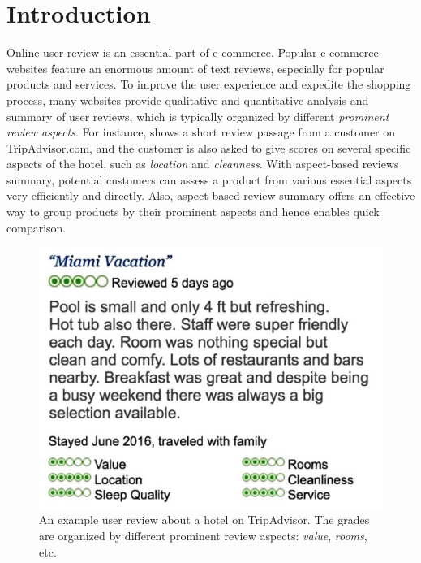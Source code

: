\section{Introduction}
\label{sec:intro}
Online user review is an essential part of e-commerce. 
Popular e-commerce websites feature an enormous amount of text reviews, 
especially for popular products and services. 
To improve the user experience and expedite the
shopping process, many websites provide qualitative and quantitative
analysis and summary of user reviews, which is typically organized by different 
{\em prominent review aspects}.
For instance,  shows a short review passage from a customer on TripAdvisor.com, and the customer is also asked
to give scores on several specific aspects of 
the hotel, such as \textit{location} and \textit{cleanness}. 
%
With aspect-based reviews summary, potential customers can 
assess a product from various essential aspects very efficiently and directly.
Also, aspect-based review summary offers an effective 
way to group products by their prominent aspects and hence
enables quick comparison.
\begin{figure}[th!]
	\centering
	\includegraphics[width=0.8\columnwidth]{figures/tripadvisor}
	\caption{An example user review about a hotel on TripAdvisor. 
		The grades are organized by different prominent review aspects: \textit{value}, \textit{rooms}, etc. }
	\label{fig:tripadvisor}
\end{figure}                                

